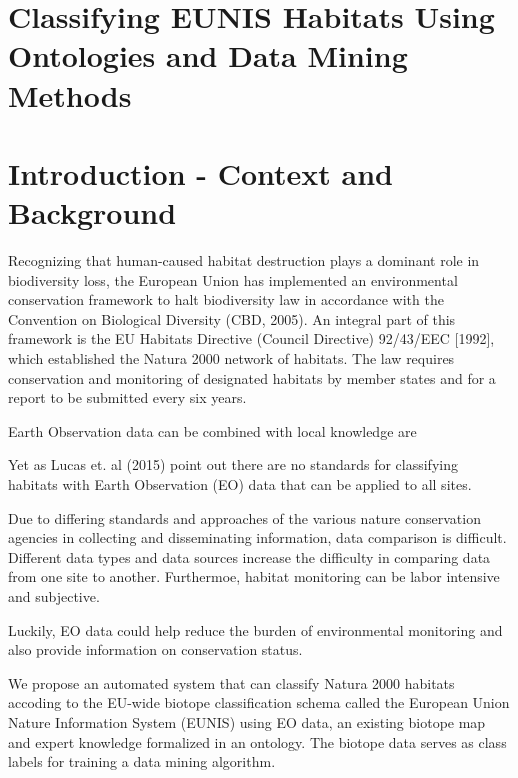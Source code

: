 \documentclass[a4paper,12pt]{article}
\begin{document}
\section{Classifying EUNIS Habitats Using Ontologies and Data Mining Methods}

\section{Introduction - Context and Background}
Recognizing that human-caused habitat destruction plays a dominant role in
biodiversity loss, the European Union has implemented an environmental
conservation framework to halt biodiversity law in accordance with the
Convention on Biological Diversity (CBD, 2005). An integral part of this
framework is the EU Habitats Directive (Council Directive) 92/43/EEC [1992],
which established the Natura 2000 network of habitats. The law requires
conservation and monitoring of designated habitats by member states and for a
report to be submitted every six years. 

Earth Observation data can be combined with local knowledge are

Yet as Lucas et. al (2015) point out there are no standards for classifying
habitats with Earth Observation (EO) data that can be applied to all sites. 

Due to differing standards and approaches of the various nature conservation
agencies in collecting and disseminating information, data comparison is
difficult. Different data types and data sources increase the difficulty in
comparing data from one site to another. Furthermoe, habitat monitoring can
be labor intensive and subjective.

Luckily, EO data could help reduce the burden of environmental monitoring and
also provide information on conservation status.

We propose an automated system that can classify Natura 2000 habitats
accoding to the EU-wide biotope classification schema called the European Union
Nature Information System (EUNIS) using EO data, an existing biotope map and
expert knowledge formalized in an ontology. The biotope data serves as class
labels for training a data mining algorithm.
\end{document}
